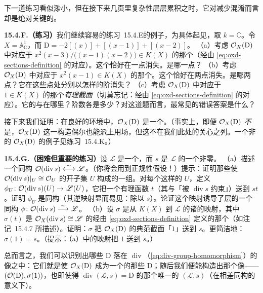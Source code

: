 下一道练习看似渺小，但在接下来几页里复杂性层层累积之时，它对减少混淆而言却是绝对关键的。

\textbf{15.4.F.（练习）}\quad 我们继续\mbox{容易的练习~15.4.E}的例子，为具体起见，取 $k=\mathbb{C}$。令 $X=\mathbb{A}^1_{\mathbb{C}}$，而 $\mathrm{D}=-2[(x)]+[(x-1)]+[(x-2)]$。
（a）考虑 $\mathcal{O}_X(\mathrm{D})$ 中对应于 $x^2(x-3)/\bigl((x-1)(x-2)\bigr)\in K(X)$ 的那个\trSection（经由 \eqref{eq:oxd-sections-definition} 的对应）。这个\trSection{}恰好在一点消失。是哪一点？
（b）考虑 $\mathcal{O}_X(\mathrm{D})$ 中对应于 $x^2(x-1)\in K(X)$ 的那个\trSection。这个\trSection{}恰好在两点消失。是哪两点？它在这些点处分别以怎样的阶消失？
（c）考虑 $\mathcal{O}_X(\mathrm{D})$ 中对应于 $1\in K(X)$ 的那个\emph{有理截面}（切莫忘记：经由 \eqref{eq:oxd-sections-definition} 的对应）。它的\trZeros{}与\trPole{}在哪里？阶数各是多少？对这道题而言，最常见的错误答案是什么？

接下来我们证明：在良好的环境中，$\mathcal{O}_X(\mathrm{D})$ 是一个\trInvertibleSheaf。（事实上，即便 $\mathcal{O}_X(\mathrm{D})$ \emph{不}是\trInvertibleSheaf，$\mathcal{O}_X(\mathrm{D})$ 这一构造偶尔也能派上用场，但这不在我们此处的关心之列。一个非\trInvertibleSheaf{}的 $\mathcal{O}_X(\mathrm{D})$ 的例子见\mbox{练习~15.4.K}。）

\textbf{15.4.G.（困难但重要的练习）}\quad 设 $\mathscr{L}$ 是一个\trInvertibleSheaf，而 $s$ 是 $\mathscr{L}$ 的一个非零\trRational\trSection。
（a）描述一个同构 $\mathcal{O}(\operatorname{div}s)\overset{\sim}{\longleftrightarrow}\mathscr{L}$。（你将会用到正规性假设！）提示：证明那些使 $\mathcal{O}(\operatorname{div}s)\vert_U\cong\mathcal{O}_U$ 的开子集 $U$ 构成\trZariskiTopology{}的一组\trBase。对每个这样的 $U$，定义 $\phi_U\colon\mathcal{O}(\operatorname{div}s)(U)\to\mathscr{L}(U)$，它把一个有理函数 $t$（其\trZeros{}与\trPole{}「被 $\operatorname{div}s$ 约束」）送到 $st$。证明 $\phi_U$ 是同构（其逆映射显而易见：除以 $s$）。论证这个映射诱导了层的一个同构 $\phi\colon\mathcal{O}(\operatorname{div}s)\overset{\sim}{\longrightarrow}\mathscr{L}$。
（b）设 $\sigma$ 是从 $K(X)$ 到 $\mathscr{L}$ 的诸\trRational\trSection{}的映射，其中 $\sigma(t)$ 是 $\mathcal{O}_X(\operatorname{div}s)\cong\mathscr{L}$ 的经由 \eqref{eq:oxd-sections-definition} 定义的那个\trRational\trSection（如\mbox{注记~15.4.7} 所描述）。证明：$\sigma$ 把 $\mathcal{O}_X(\mathrm{D})$ 的典范截面「$1$」送到 $s$。更简洁地：$\sigma(1)=s$。（提示：（a）中的映射把 $1$ 送到 $s$。）

总而言之，我们可以识别出哪些\trWeilDivisor{} $\mathrm{D}$ 落在 $\operatorname{div}$（\eqref{eq:div-group-homomorphism}）的像之中：它们就是使 $\mathcal{O}_X(\mathrm{D})$ 成为一个\trLineBundle{}的那些 $\mathrm{D}$；随后我们便能构造出那个像——$(\mathcal{O}(\mathrm{D}),\sigma(1))$，也即使得 $\operatorname{div}(\mathscr{L},s)=\mathrm{D}$ 的那个唯一的 $(\mathscr{L},s)$（在相差同构的意义下）。

